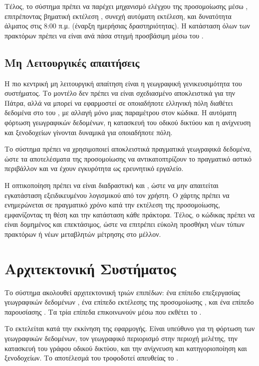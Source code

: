 Τέλος, το σύστημα πρέπει να παρέχει μηχανισμό ελέγχου της
προσομοίωσης μέσω , επιτρέποντας βηματική
εκτέλεση , συνεχή αυτόματη εκτέλεση,
και δυνατότητα άλματος στις 8:00 π.μ. (έναρξη ημερήσιας
δραστηριότητας). Η κατάσταση όλων των πρακτόρων πρέπει να
είναι ανά πάσα στιγμή προσβάσιμη μέσω του .

\subsection{Μη Λειτουργικές απαιτήσεις}

Η πιο κεντρική μη λειτουργική απαίτηση είναι η γεωγραφική
γενικευσιμότητα του συστήματος. Το μοντέλο δεν πρέπει να
είναι σχεδιασμένο αποκλειστικά για την Πάτρα, αλλά να μπορεί
να εφαρμοστεί σε οποιαδήποτε ελληνική πόλη διαθέτει δεδομένα
στο  του , με αλλαγή
μόνο μιας παραμέτρου  στον κώδικα. Η αυτόματη
φόρτωση γεωγραφικών δεδομένων, η κατασκευή του οδικού δικτύου
και η ανίχνευση  και ξενοδοχείων γίνονται δυναμικά για
οποιαδήποτε πόλη.

Το σύστημα πρέπει να χρησιμοποιεί αποκλειστικά πραγματικά
γεωγραφικά δεδομένα, ώστε τα αποτελέσματα της προσομοίωσης να
αντικατοπτρίζουν το πραγματικό αστικό περιβάλλον και να έχουν
εγκυρότητα ως ερευνητικό εργαλείο.

Η οπτικοποίηση πρέπει να είναι διαδραστική και ,
ώστε να μην απαιτείται εγκατάσταση εξειδικευμένου λογισμικού
από τον χρήστη. Ο χάρτης πρέπει να ενημερώνεται σε πραγματικό
χρόνο κατά την εκτέλεση της προσομοίωσης, εμφανίζοντας τη θέση
και την κατάσταση κάθε πράκτορα. Τέλος, ο κώδικας πρέπει να
είναι δομημένος και επεκτάσιμος, ώστε να επιτρέπει εύκολη
προσθήκη νέων τύπων πρακτόρων ή νέων μεταβλητών μέτρησης στο
μέλλον.

\section{Αρχιτεκτονική Συστήματος}

Το σύστημα ακολουθεί αρχιτεκτονιική τριών επιπέδων: ένα επίπεδο
επεξεργασίας γεωγραφικών δεδομένων , ένα
επίπεδο εκτέλεσης της προσομοίωσης , και
ένα επίπεδο παρουσίασης . Τα τρία επίπεδα
επικοινωνούν μέσω  που εκθέτει το .

Το  εκτελείται κατά την εκκίνηση της εφαρμογής.
Είναι υπεύθυνο για τη φόρτωση των γεωγραφικών δεδομένων, τον
γεωγραφικό περιορισμό στην περιοχή μελέτης, την κατασκευή του
γράφου οδικού δικτύου, και την ανίχνευση και κατηγοριοποίηση
 και ξενοδοχείων. Το αποτέλεσμά του τροφοδοτεί απευθείας
το .

